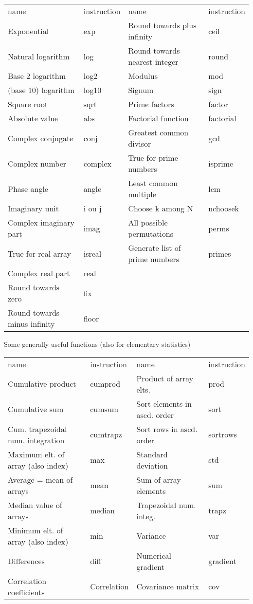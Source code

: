\documentclass[12pt,a4paper]{article}
\begin{document}
\bigskip 
\begin{tabular}{ll|ll}
name & instruction & name & instruction \\ 
Exponential & exp & Round towards plus infinity & ceil \\ 
Natural logarithm & log & Round towards nearest integer & round \\ 
Base 2 logarithm & log2 & Modulus & mod \\ 
(base 10) logarithm & log10 & Signum & sign \\ 
Square root & sqrt & Prime factors & factor \\ 
Absolute value & abs & Factorial function & factorial \\ 
Complex conjugate & conj & Greatest common divisor & gcd \\ 
Complex number & complex & True for prime numbers & isprime \\ 
Phase angle & angle & Least common multiple & lcm \\ 
Imaginary unit & i ou j & Choose k among N & nchoosek \\ 
Complex imaginary part & imag & All possible permutations & perms \\ 
True for real array & isreal & Generate list of prime numbers & primes \\ 
Complex real part & real &  &  \\ 
Round towards zero & fix &  &  \\ 
Round towards minus infinity & floor &  & 
\end{tabular}

\bigskip Some generally useful functions (also for elementary statistics)

\begin{tabular}{ll|ll}
name & instruction & name & instruction \\ 
Cumulative product & cumprod & Product of array elts. & prod \\ 
Cumulative sum & cumsum & Sort elements in ascd. order & sort \\ 
Cum. trapezoidal num. integration & cumtrapz & Sort rows in ascd. order & 
sortrows \\ 
Maximum elt. of array (also index) & max & Standard deviation & std \\ 
Average = mean of arrays & mean & Sum of array elements & sum \\ 
Median value of arrays & median & Trapezoidal num. integ. & trapz \\ 
Minimum elt. of array (also index) & min & Variance & var \\ 
Differences & diff & Numerical gradient & gradient \\ 
Correlation coefficients & Correlation & Covariance matrix & cov%
\end{tabular}
\end{document}
